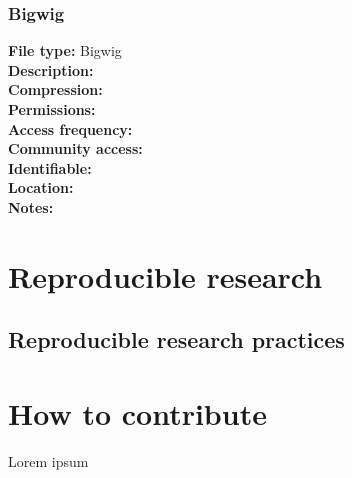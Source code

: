 \documentclass[
  11pt,
]{book}
\begin{document}
\hypertarget{bigwig}{%
\subsection{Bigwig}\label{bigwig}}

\textbf{File type:} Bigwig\\
\textbf{Description:}\\
\textbf{Compression:}\\
\textbf{Permissions:}\\
\textbf{Access frequency:}\\
\textbf{Community access:}\\
\textbf{Identifiable:}\\
\textbf{Location:}\\
\textbf{Notes:}

\hypertarget{reproducible-research}{%
\chapter{Reproducible research}\label{reproducible-research}}

\hypertarget{reproducible-research-practices}{%
\section{Reproducible research practices}\label{reproducible-research-practices}}

\hypertarget{how-to-contribute}{%
\chapter{How to contribute}\label{how-to-contribute}}

Lorem ipsum

  
\end{document}
